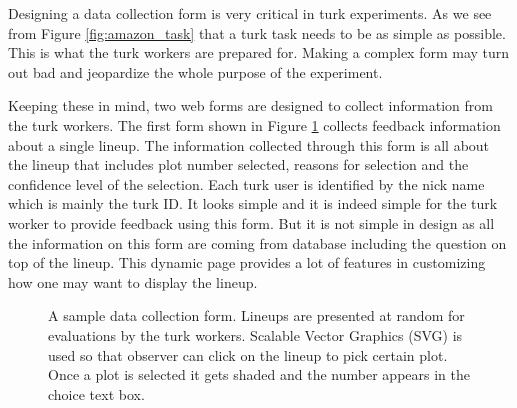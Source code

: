 \documentclass[11pt]{article}
\begin{document}
Designing a data collection form is very critical in turk experiments. As we see from Figure \ref{fig:amazon_task} that a turk task needs to be as simple as possible. This is what the turk workers are prepared for. Making a complex form may turn out bad and jeopardize the whole purpose of the experiment. 

Keeping these in mind, two web forms are designed to collect information from the turk workers. The first form shown in Figure \ref{fig:turk_web} collects feedback information about a single lineup. The information collected through this form is all about the lineup that includes plot number selected, reasons for selection and the confidence level of the selection. Each turk user is identified by the nick name which is mainly the turk ID. It looks simple and it is indeed simple for the turk worker to provide feedback using this form. But it is not simple in design as all the information on this form are coming from database including the question on top of the lineup. This dynamic page provides a lot of features in customizing how one may want to display the lineup.

\begin{figure}[hbtp]
   \centering
       \caption{A sample data collection form. Lineups are presented at random for evaluations by the turk workers. Scalable Vector Graphics (SVG) is used so that observer can click on the lineup to pick certain plot. Once a plot is selected it gets shaded and the number appears in the choice text box.}
       \label{fig:turk_web}
\end{figure}
\end{document}
